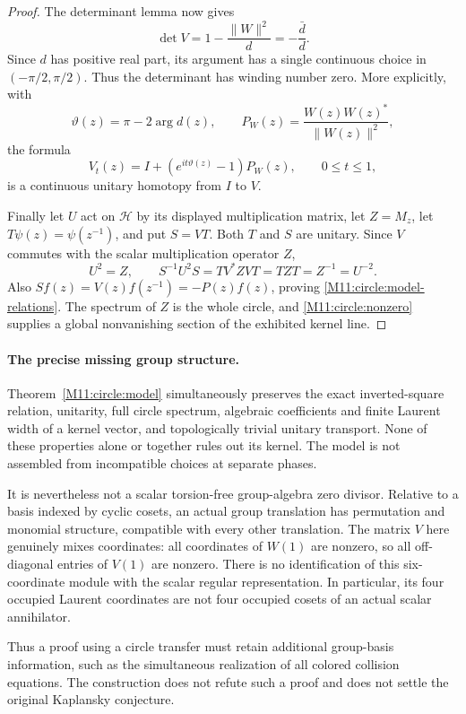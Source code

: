 \documentclass[11pt,a4paper,oneside]{report}
\theoremstyle{definition}
\theoremstyle{remark}
\begin{document}
\begin{proof}
The determinant lemma now gives
\[
\det V=1-\frac{\|W\|^2}{d}=-\frac{\bar d}{d}.
\]
Since $d$ has positive real part, its argument has a single
continuous choice in $(-\pi/2,\pi/2)$. Thus the determinant
has winding number zero. More explicitly, with
\[
\vartheta(z)=\pi-2\arg d(z),\qquad
P_W(z)=\frac{W(z)W(z)^*}{\|W(z)\|^2},
\]
the formula
\[
V_t(z)=I+(e^{it\vartheta(z)}-1)P_W(z),\qquad 0\le t\le1,
\]
is a continuous unitary homotopy from $I$ to $V$.

Finally let $U$ act on $\mathcal H$ by its displayed multiplication
matrix, let $Z=M_z$, let $T\psi(z)=\psi(z^{-1})$, and put
$S=VT$. Both $T$ and $S$ are unitary. Since $V$ commutes with
the scalar multiplication operator $Z$,
\[
U^2=Z,\qquad
S^{-1}U^2S=T V^*ZVT=T ZT=Z^{-1}=U^{-2}.
\]
Also $Sf(z)=V(z)f(z^{-1})=-P(z)f(z)$, proving
\eqref{M11:circle:model-relations}. The spectrum of $Z$ is the whole
circle, and \eqref{M11:circle:nonzero} supplies a global nonvanishing
section of the exhibited kernel line.
\end{proof}

\paragraph{The precise missing group structure.}
Theorem~\ref{M11:circle:model} simultaneously preserves the exact
inverted-square relation, unitarity, full circle spectrum, algebraic
coefficients and finite Laurent width of a kernel vector, and
topologically trivial unitary transport. None of these properties
alone or together rules out its kernel. The model is not assembled
from incompatible choices at separate phases.

It is nevertheless not a scalar torsion-free group-algebra zero
divisor. Relative to a basis indexed by cyclic cosets, an actual
group translation has permutation and monomial structure, compatible
with every other translation. The matrix $V$ here genuinely mixes
coordinates: all coordinates of $W(1)$ are nonzero, so all
off-diagonal entries of $V(1)$ are nonzero. There is no identification
of this six-coordinate module with the scalar regular representation.
In particular, its four occupied Laurent coordinates are not four
occupied cosets of an actual scalar annihilator.

Thus a proof using a circle transfer must retain additional
group-basis information, such as the simultaneous realization of
all colored collision equations. The construction does not refute
such a proof and does not settle the original Kaplansky conjecture.
\end{document}
